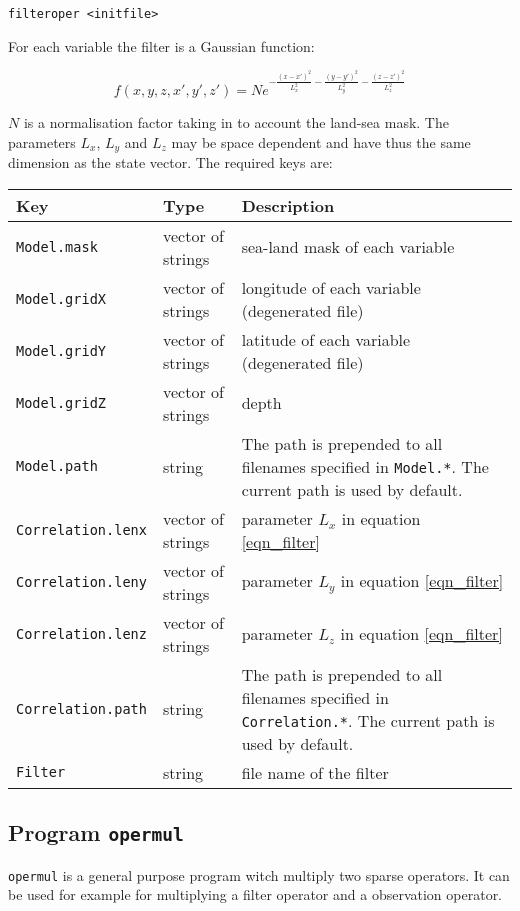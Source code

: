 \documentclass[a4paper,12pt]{article}
\newcommand{\code}{\texttt}
\newenvironment{keytabular}{\begin{tabular}{|p{0.3\textwidth}|p{0.2\textwidth}|p{0.5\textwidth}|} \hline Key & Type & Description \\ \hline \hline }{\end{tabular}}
\begin{document}
\begin{verbatim}
filteroper <initfile>
\end{verbatim}

For each variable the filter is a Gaussian function:

\begin{equation} \label{eqn_filter}
f(x,y,z,x',y',z') = N e^{-\frac{(x-x')^2}{L_x^2}-\frac{(y-y')^2}{L_y^2}-\frac{(z-z')^2}{L_z^2}}
\end{equation}

$N$ is a normalisation factor taking in to account the land-sea mask. The parameters $L_x$, $L_y$ and $L_z$ may be space dependent and have thus the same dimension as the state vector.
The required keys are: \\

\begin{keytabular}
\code{Model.mask} & vector of strings &  sea-land mask of each variable 
\\
\code{Model.gridX} & vector of strings & longitude of each variable (degenerated file)
\\
\code{Model.gridY} & vector of strings & latitude of each variable (degenerated file)
\\
\code{Model.gridZ} & vector of strings & depth 
\\
\code{Model.path} & string & The path is prepended to all filenames
specified in \code{Model.*}. The current path is used by default.
\\
\code{Correlation.lenx} & vector of strings & parameter $L_x$ in equation \ref{eqn_filter}
\\
\code{Correlation.leny} & vector of strings & parameter $L_y$ in equation \ref{eqn_filter}
\\
\code{Correlation.lenz} & vector of strings & parameter $L_z$ in equation \ref{eqn_filter}
\\
\code{Correlation.path} & string & The path is prepended to all filenames
specified in \code{Correlation.*}. The current path is used by default.
\\
\code{Filter} & string & file name of the filter
\\
\hline
\end{keytabular}

\subsection{Program \code{opermul}}

\code{opermul} is a general purpose program witch multiply two sparse operators. It can be used for example for multiplying a filter operator and a observation operator.
\end{document}

